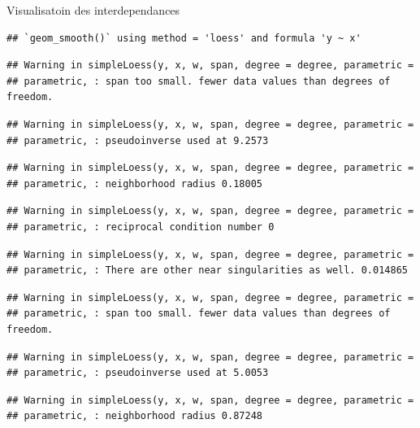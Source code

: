 \documentclass[11pt,ignorenonframetext,]{beamer}
\begin{document}
\begin{frame}[fragile]{Visualisatoin des interdependances}
\protect\hypertarget{visualisatoin-des-interdependances-1}{}

\begin{verbatim}
## `geom_smooth()` using method = 'loess' and formula 'y ~ x'
\end{verbatim}

\begin{verbatim}
## Warning in simpleLoess(y, x, w, span, degree = degree, parametric =
## parametric, : span too small. fewer data values than degrees of freedom.
\end{verbatim}

\begin{verbatim}
## Warning in simpleLoess(y, x, w, span, degree = degree, parametric =
## parametric, : pseudoinverse used at 9.2573
\end{verbatim}

\begin{verbatim}
## Warning in simpleLoess(y, x, w, span, degree = degree, parametric =
## parametric, : neighborhood radius 0.18005
\end{verbatim}

\begin{verbatim}
## Warning in simpleLoess(y, x, w, span, degree = degree, parametric =
## parametric, : reciprocal condition number 0
\end{verbatim}

\begin{verbatim}
## Warning in simpleLoess(y, x, w, span, degree = degree, parametric =
## parametric, : There are other near singularities as well. 0.014865
\end{verbatim}

\begin{verbatim}
## Warning in simpleLoess(y, x, w, span, degree = degree, parametric =
## parametric, : span too small. fewer data values than degrees of freedom.
\end{verbatim}

\begin{verbatim}
## Warning in simpleLoess(y, x, w, span, degree = degree, parametric =
## parametric, : pseudoinverse used at 5.0053
\end{verbatim}

\begin{verbatim}
## Warning in simpleLoess(y, x, w, span, degree = degree, parametric =
## parametric, : neighborhood radius 0.87248
\end{verbatim}


\end{frame}
\end{document}
